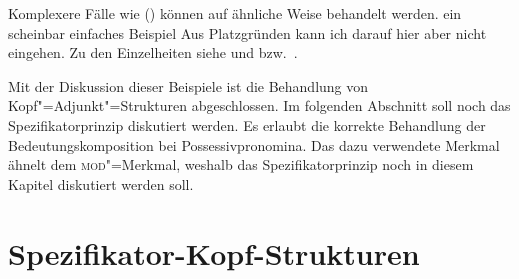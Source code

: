 Komplexere Fälle wie () können auf ähnliche Weise behandelt werden.
\ea
ein scheinbar einfaches Beispiel
\z
Aus Platzgründen kann ich darauf hier aber nicht eingehen. Zu den Einzelheiten siehe  und
 bzw.\ .%

Mit der Diskussion dieser Beispiele ist die Behandlung von Kopf"=Adjunkt"=Strukturen abgeschlossen.
Im folgenden Abschnitt soll noch das Spezifikatorprinzip diskutiert werden. Es erlaubt die korrekte
Behandlung der Bedeutungskomposition bei Possessivpronomina. Das dazu verwendete Merkmal ähnelt
dem \textsc{mod}"=Merkmal, weshalb das Spezifikatorprinzip noch in diesem Kapitel diskutiert werden soll.




\section{Spezifikator-Kopf-Strukturen}
\label{sec-spec-kopf}

